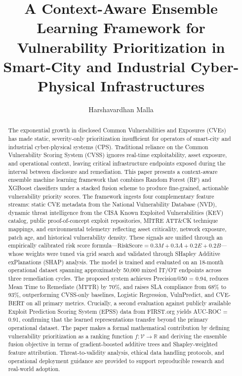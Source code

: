 \documentclass[review,12pt]{elsarticle}
\begin{document}
\begin{frontmatter}

\title{A Context-Aware Ensemble Learning Framework for Vulnerability Prioritization in Smart-City and Industrial Cyber-Physical Infrastructures}

\author[adr]{Harshavardhan Malla}

\address[adr]{Independent Researcher, Phoenix, AZ 85001, USA}

\begin{abstract}
The exponential growth in disclosed Common Vulnerabilities and Exposures (CVEs) has made static, severity-only prioritization insufficient for operators of smart-city and industrial cyber-physical systems (CPS). Traditional reliance on the Common Vulnerability Scoring System (CVSS) ignores real-time exploitability, asset exposure, and operational context, leaving critical infrastructure endpoints exposed during the interval between disclosure and remediation. This paper presents a context-aware ensemble machine learning framework that combines Random Forest (RF) and XGBoost classifiers under a stacked fusion scheme to produce fine-grained, actionable vulnerability priority scores. The framework ingests four complementary feature streams: static CVE metadata from the National Vulnerability Database (NVD), dynamic threat intelligence from the CISA Known Exploited Vulnerabilities (KEV) catalog, public proof-of-concept exploit repositories, MITRE ATT\&CK technique mappings, and environmental telemetry reflecting asset criticality, network exposure, patch age, and historical vulnerability density. These signals are unified through an empirically calibrated risk score formula---$\text{RiskScore} = 0.3M + 0.3A + 0.2E + 0.2B$---whose weights were tuned via grid search and validated through SHapley Additive exPlanations (SHAP) analysis. The model is trained and evaluated on an 18-month operational dataset spanning approximately 50,000 mixed IT/OT endpoints across three remediation cycles. The proposed system achieves Precision@50 = 0.94, reduces Mean Time to Remediate (MTTR) by 70\%, and raises SLA compliance from 68\% to 93\%, outperforming CVSS-only baselines, Logistic Regression, VulnPredict, and CVE-BERT on all primary metrics. Crucially, a second evaluation against publicly available Exploit Prediction Scoring System (EPSS) data from FIRST.org yields AUC-ROC = 0.91, confirming that the learned representations transfer beyond the primary operational dataset. The paper makes a formal mathematical contribution by defining vulnerability prioritization as a ranking function $f: \mathcal{V} \rightarrow \mathbb{R}$ and deriving the ensemble fusion objective in terms of gradient-boosted additive trees and Shapley-weighted feature attribution. Threat-to-validity analysis, ethical data handling protocols, and operational deployment guidance are provided to support reproducible research and real-world adoption.
\end{abstract}


\end{frontmatter}
\end{document}
